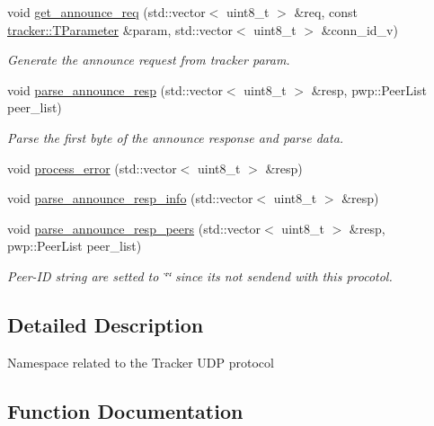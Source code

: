 \begin{DoxyCompactItemize}
void \hyperlink{namespacet__udp_a5e968355a7c45dae0749b80e1be8308a}{get\+\_\+announce\+\_\+req} (std\+::vector$<$ uint8\+\_\+t $>$ \&req, const \hyperlink{structtracker_1_1TParameter}{tracker\+::\+T\+Parameter} \&param, std\+::vector$<$ uint8\+\_\+t $>$ \&conn\+\_\+id\+\_\+v)
\begin{DoxyCompactList}\small\item\em Generate the announce request from tracker param. \end{DoxyCompactList}\item 
void \hyperlink{namespacet__udp_a1f2a0ab9801cbc55002e67c166895a0e}{parse\+\_\+announce\+\_\+resp} (std\+::vector$<$ uint8\+\_\+t $>$ \&resp, pwp\+::\+Peer\+List peer\+\_\+list)
\begin{DoxyCompactList}\small\item\em Parse the first byte of the announce response and parse data. \end{DoxyCompactList}\item 
void \hyperlink{namespacet__udp_aab582ebbfac6fd929e811527e44384c1}{process\+\_\+error} (std\+::vector$<$ uint8\+\_\+t $>$ \&resp)
\item 
void \hyperlink{namespacet__udp_a42ced8af1acd3fb2bc46358effe48dbc}{parse\+\_\+announce\+\_\+resp\+\_\+info} (std\+::vector$<$ uint8\+\_\+t $>$ \&resp)
\item 
void \hyperlink{namespacet__udp_a8aa6906fdd81689928634df34688fed1}{parse\+\_\+announce\+\_\+resp\+\_\+peers} (std\+::vector$<$ uint8\+\_\+t $>$ \&resp, pwp\+::\+Peer\+List peer\+\_\+list)
\begin{DoxyCompactList}\small\item\em Peer-\/\+ID string are setted to \char`\"{}\char`\"{} since it\textquotesingle{}s not sendend with this procotol. \end{DoxyCompactList}\end{DoxyCompactItemize}


\subsection{Detailed Description}
Namespace related to the Tracker U\+DP protocol 

\subsection{Function Documentation}
\mbox{\label{namespacet__udp_a5e968355a7c45dae0749b80e1be8308a}} 
